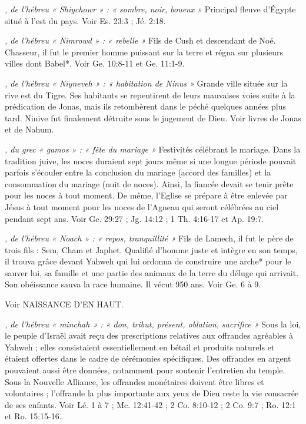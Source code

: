 \begin{multicols}{2}
\textit{, de l'hébreu « Shiychowr » : « sombre, noir, boueux »}\newline
Principal fleuve d'Égypte situé à l'est du pays. Voir Es. 23:3 ; Jé. 2:18.

\textit{, de l'hébreu « Nimrowd » : « rebelle »}\newline
Fils de Cush et descendant de Noé. Chasseur, il fut le premier homme puissant sur la terre et régna sur plusieurs villes dont Babel*. Voir Ge. 10:8-11 et Ge. 11:1-9.

\textit{, de l'hébreu « Niyneveh » : « habitation de Ninus »}\newline
Grande ville située sur la rive est du Tigre. Ses habitants se repentirent de leurs mauvaises voies suite à la prédication de Jonas, mais ils retombèrent dans le péché quelques années plus tard. Ninive fut finalement détruite sous le jugement de Dieu. Voir livres de Jonas et de Nahum.

\textit{, du grec « gamos » : « fête du mariage »}\newline
Festivités célébrant le mariage. Dans la tradition juive, les noces duraient sept jours même si une longue période pouvait parfois s'écouler entre la conclusion du mariage (accord des familles) et la consommation du mariage (nuit de noces). Ainsi, la fiancée devait se tenir prête pour les noces à tout moment. De même, l'Eglise se prépare à être enlevée par Jésus à tout moment pour les noces de l'Agneau qui seront célébrées au ciel pendant sept ans. Voir Ge. 29:27 ; Jg. 14:12 ; 1 Th. 4:16-17 et Ap. 19:7.

\textit{, de l'hébreu « Noach » : « repos, tranquillité »}\newline
Fils de Lamech, il fut le père de trois fils : Sem, Cham et Japhet. Qualifié d'homme juste et intègre en son temps, il trouva grâce devant Yahweh qui lui ordonna de construire une arche* pour le sauver lui, sa famille et une partie des animaux de la terre du déluge qui arrivait. Son obéissance sauva la race humaine. Il vécut 950 ans. Voir Ge. 6 à 9.

\textit{}\newline
Voir NAISSANCE D'EN HAUT.

\textit{, de l'hébreu « minchah » : « don, tribut, présent, oblation, sacrifice »}\newline
Sous la loi, le peuple d'Israël avait reçu des prescriptions relatives aux offrandes agréables à Yahweh ; elles consistaient essentiellement en bétail et produits naturels et étaient offertes dans le cadre de cérémonies spécifiques. Des offrandes en argent pouvaient aussi être données, notamment pour soutenir l'entretien du temple. Sous la Nouvelle Alliance, les offrandes monétaires doivent être libres et volontaires ; l'offrande la plus importante aux yeux de Dieu reste la vie consacrée de ses enfants. Voir Lé. 1 à 7 ; Mc. 12:41-42 ; 2 Co. 8:10-12 ; 2 Co. 9:7 ; Ro. 12:1 et Ro. 15:15-16.


\end{multicols}
